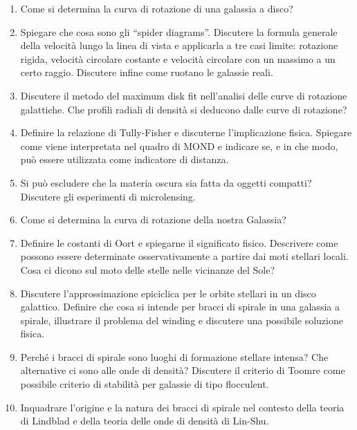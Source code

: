 \begin{enumerate}
    \item Come si determina la curva di rotazione di una galassia a disco?
    \item Spiegare che cosa sono gli “spider diagrams”. Discutere la formula generale della velocità lungo la linea di vista e applicarla a tre casi limite: rotazione rigida, velocità circolare costante e velocità circolare con un massimo a un certo raggio. Discutere infine come ruotano le galassie reali.
    \item Discutere il metodo del maximum disk fit nell’analisi delle curve di rotazione galattiche. Che profili radiali di densità si deducono dalle curve di rotazione?
    \item Definire la relazione di Tully-Fisher e discuterne l’implicazione fisica. Spiegare come viene interpretata nel quadro di MOND e indicare se, e in che modo, può essere utilizzata come indicatore di distanza.
    \item Si può escludere che la materia oscura sia fatta da oggetti compatti? Discutere gli esperimenti di microlensing.
    \item Come si determina la curva di rotazione della nostra Galassia?
    \item Definire le costanti di Oort e spiegarne il significato fisico. Descrivere come possono essere determinate osservativamente a partire dai moti stellari locali. Cosa ci dicono sul moto delle stelle nelle vicinanze del Sole?
    \item Discutere l’approssimazione epiciclica per le orbite stellari in un disco galattico. Definire che cosa si intende per bracci di spirale in una galassia a spirale, illustrare il problema del winding e discutere una possibile soluzione fisica.
    \item Perché i bracci di spirale sono luoghi di formazione stellare intensa? Che alternative ci sono alle onde di densità? Discutere il criterio di Toomre come possibile criterio di stabilità per galassie di tipo flocculent.
    \item Inquadrare l’origine e la natura dei bracci di spirale nel contesto della teoria di Lindblad e della teoria delle onde di densità di Lin-Shu.
\end{enumerate}